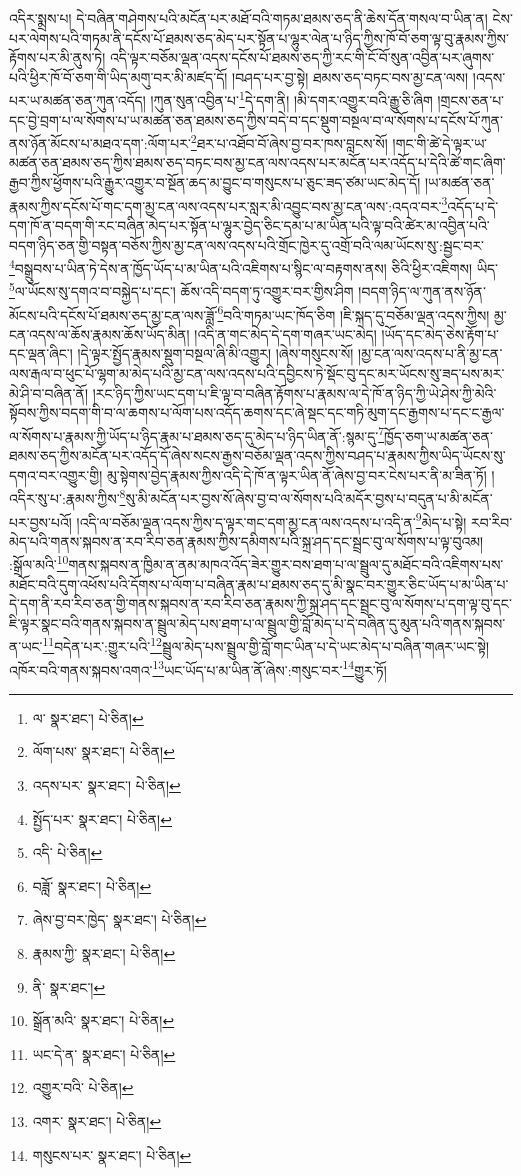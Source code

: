 འདིར་སྨྲས་པ། དེ་བཞིན་གཤེགས་པའི་མངོན་པར་མཐོ་བའི་གཏམ་ཐམས་ཅད་ནི་ཆེས་དོན་གསལ་བ་ཡིན་ན། ངེས་པར་ལེགས་པའི་གཏམ་ནི་དངོས་པོ་ཐམས་ཅད་མེད་པར་སྟོན་པ་ལྷུར་ལེན་པ་ཉིད་ཀྱིས་ཁོ་བོ་ཅག་ལྟ་བུ་རྣམས་ཀྱིས་རྟོགས་པར་མི་ནུས་ཏེ། འདི་ལྟར་བཅོམ་ལྡན་འདས་དངོས་པོ་ཐམས་ཅད་ཀྱི་རང་གི་ངོ་བོ་སུན་འབྱིན་པར་ཞུགས་པའི་ཕྱིར་ཁོ་བོ་ཅག་གི་ཡིད་མགུ་བར་མི་མཛད་དོ། །བཤད་པར་བྱ་སྟེ། ཐམས་ཅད་བཏང་བས་མྱ་ངན་ལས། །འདས་པར་ཡ་མཚན་ཅན་ཀུན་འདོད། །ཀུན་སུན་འབྱིན་པ་\footnote{ལ་  སྣར་ཐང་།  པེ་ཅིན། }དེ་དག་ནི། །མི་དགར་འགྱུར་བའི་རྒྱུ་ཅི་ཞིག །གྲངས་ཅན་པ་དང་བྱེ་བྲག་པ་ལ་སོགས་པ་ཡ་མཚན་ཅན་ཐམས་ཅད་ཀྱིས་བདེ་བ་དང་སྡུག་བསྔལ་བ་ལ་སོགས་པ་དངོས་པོ་ཀུན་ནས་ཉོན་མོངས་པ་མཐའ་དག་:ལོག་པར་\footnote{ལོག་པས་  སྣར་ཐང་།  པེ་ཅིན། }ཐར་པ་འཐོབ་བོ་ཞེས་བྱ་བར་ཁས་བླངས་སོ། །གང་གི་ཚེ་དེ་ལྟར་ཡ་མཚན་ཅན་ཐམས་ཅད་ཀྱིས་ཐམས་ཅད་བཏང་བས་མྱ་ངན་ལས་འདས་པར་མངོན་པར་འདོད་པ་དེའི་ཚེ་གང་ཞིག་རྒྱབ་ཀྱིས་ཕྱོགས་པའི་རྒྱུར་འགྱུར་བ་སྔོན་ཆད་མ་བྱུང་བ་གསུངས་པ་ཅུང་ཟད་ཙམ་ཡང་མེད་དོ། །ཡ་མཚན་ཅན་རྣམས་ཀྱིས་དངོས་པོ་གང་དག་མྱ་ངན་ལས་འདས་པར་སླར་མི་འབྱུང་བས་མྱ་ངན་ལས་:འདའ་བར་\footnote{འདས་པར་  སྣར་ཐང་།  པེ་ཅིན། }འདོད་པ་དེ་དག་ཁོ་ན་བདག་གི་རང་བཞིན་མེད་པར་སྟོན་པ་ལྷུར་བྱེད་ཅིང་དམ་པ་མ་ཡིན་པའི་ལྟ་བའི་ཚེར་མ་འབྱིན་པའི་བདག་ཉིད་ཅན་གྱི་བསྟན་བཅོས་ཀྱིས་མྱ་ངན་ལས་འདས་པའི་གྲོང་ཁྱེར་དུ་འགྲོ་བའི་ལམ་ཡོངས་སུ་:སྦྱང་བར་\footnote{སྤྱོད་པར་  སྣར་ཐང་།  པེ་ཅིན། }བསྒྲུབས་པ་ཡིན་ཏེ་དེས་ན་ཁྱོད་ཡོད་པ་མ་ཡིན་པའི་འཇིགས་པ་སྙིང་ལ་བརྟགས་ནས། ཅིའི་ཕྱིར་འཇིགས། ཡིད་\footnote{འདི་  པེ་ཅིན། }ལ་ཡོངས་སུ་དགའ་བ་བསྐྱེད་པ་དང་། ཆོས་འདི་བདག་ཏུ་འགྱུར་བར་གྱིས་ཤིག །བདག་ཉིད་ལ་ཀུན་ནས་ཉོན་མོངས་པའི་དངོས་པོ་ཐམས་ཅད་མྱ་ངན་ལས་ཟློ་\footnote{བཟློ་  སྣར་ཐང་།  པེ་ཅིན། }བའི་གཏམ་ཡང་ཁོད་ཅིག །ཇི་སྐད་དུ་བཅོམ་ལྡན་འདས་ཀྱིས། མྱ་ངན་འདས་ལ་ཆོས་རྣམས་ཆོས་ཡོད་མིན། །འདི་ན་གང་མེད་དེ་དག་གཞར་ཡང་མེད། །ཡོད་དང་མེད་ཅེས་རྟོག་པ་དང་ལྡན་ཞིང་། །དེ་ལྟར་སྤྱོད་རྣམས་སྡུག་བསྔལ་ཞི་མི་འགྱུར། །ཞེས་གསུངས་སོ། །མྱ་ངན་ལས་འདས་པ་ནི་མྱ་ངན་ལས་རྒལ་བ་ཕུང་པོ་ལྷག་མ་མེད་པའི་མྱ་ངན་ལས་འདས་པའི་དབྱིངས་ཏེ་སྡོང་བུ་དང་མར་ཡོངས་སུ་ཟད་པས་མར་མེ་ཤི་བ་བཞིན་ནོ། །རང་ཉིད་ཀྱིས་ཡང་དག་པ་ཇི་ལྟ་བ་བཞིན་རྟོགས་པ་རྣམས་ལ་དེ་ཁོ་ན་ཉིད་ཀྱི་ཡེ་ཤེས་ཀྱི་མེའི་སྟོབས་ཀྱིས་བདག་གི་བ་ལ་ཆགས་པ་ལོག་པས་འདོད་ཆགས་དང་ཞེ་སྡང་དང་གཏི་མུག་དང་རྒྱགས་པ་དང་ང་རྒྱལ་ལ་སོགས་པ་རྣམས་ཀྱི་ཡོད་པ་ཉིད་རྣམ་པ་ཐམས་ཅད་དུ་མེད་པ་ཉིད་ཡིན་ནོ་:སྙམ་དུ་\footnote{ཞེས་བྱ་བར་ཁྱེད་  སྣར་ཐང་།  པེ་ཅིན། }ཁྱོད་ཅག་ཡ་མཚན་ཅན་ཐམས་ཅད་ཀྱིས་མངོན་པར་འདོད་དོ་ཞེས་སངས་རྒྱས་བཅོམ་ལྡན་འདས་ཀྱིས་བཤད་པ་རྣམས་ཀྱིས་ཡིད་ཡོངས་སུ་དགའ་བར་འགྱུར་གྱི། མུ་སྟེགས་བྱེད་རྣམས་ཀྱིས་འདི་དེ་ཁོ་ན་ལྟར་ཡིན་ནོ་ཞེས་བྱ་བར་ངེས་པར་ནི་མ་ཟིན་ཏོ། །འདིར་སུ་པ་:རྣམས་ཀྱིས་\footnote{རྣམས་ཀྱི་  སྣར་ཐང་།  པེ་ཅིན། }སུ་མི་མངོན་པར་བྱས་སོ་ཞེས་བྱ་བ་ལ་སོགས་པའི་མདོར་བྱས་པ་བདུན་པ་མི་མངོན་པར་བྱས་པའོ། །འདི་ལ་བཅོམ་ལྡན་འདས་ཀྱིས་ད་ལྟར་གང་དག་མྱ་ངན་ལས་འདས་པ་འདི་ན་\footnote{ནི་  སྣར་ཐང་། }མེད་པ་སྟེ། རབ་རིབ་མེད་པའི་གནས་སྐབས་ན་རབ་རིབ་ཅན་རྣམས་ཀྱིས་དམིགས་པའི་སྐྲ་ཤད་དང་སྦྲང་བུ་ལ་སོགས་པ་ལྟ་བུའམ། :སྒྲོལ་མའི་\footnote{སྒྲོན་མའི་  སྣར་ཐང་།  པེ་ཅིན། }གནས་སྐབས་ན་ཁྱིམ་ན་ནམ་མཁའ་འོད་ཟེར་གྱུར་བས་ཐག་པ་ལ་སྦྲུལ་དུ་མཐོང་བའི་འཇིགས་པས་མཐོང་བའི་དུག་འཕོས་པའི་དོགས་པ་ལོག་པ་བཞིན་རྣམ་པ་ཐམས་ཅད་དུ་མི་སྣང་བར་གྱུར་ཅིང་ཡོད་པ་མ་ཡིན་པ་དེ་དག་ནི་རབ་རིབ་ཅན་གྱི་གནས་སྐབས་ན་རབ་རིབ་ཅན་རྣམས་ཀྱི་སྐྲ་ཤད་དང་སྦྲང་བུ་ལ་སོགས་པ་དག་ལྟ་བུ་དང་ཇི་ལྟར་སྣང་བའི་གནས་སྐབས་ན་སྦྲུལ་མེད་པས་ཐག་པ་ལ་སྦྲུལ་གྱི་བློ་མེད་པ་དེ་བཞིན་དུ་མུན་པའི་གནས་སྐབས་ན་ཡང་\footnote{ཡང་དེ་ན་  སྣར་ཐང་།  པེ་ཅིན། }བདེན་པར་:གྱུར་པའི་\footnote{འགྱུར་བའི་  པེ་ཅིན། }སྦྲུལ་མེད་པས་སྦྲུལ་གྱི་བློ་གང་ཡིན་པ་དེ་ཡང་མེད་པ་བཞིན་གཞར་ཡང་སྟེ། འཁོར་བའི་གནས་སྐབས་འགའ་\footnote{འགར་  སྣར་ཐང་།  པེ་ཅིན། }ཡང་ཡོད་པ་མ་ཡིན་ནོ་ཞེས་:གསུང་བར་\footnote{གསུངས་པར་  སྣར་ཐང་།  པེ་ཅིན། }གྱུར་ཏོ། 